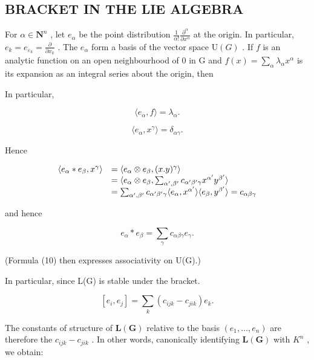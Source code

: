 \subsection{BRACKET IN THE LIE ALGEBRA}

For \(\alpha \in \mathbf{N}^n\) , let \(e_{\alpha}\) be the point distribution \(\frac{1}{\alpha!} \frac{\partial^{\alpha}}{\partial x^{\alpha}}\) at the origin. In particular, \(e_k = e_{\varepsilon_k} = \frac{\partial}{\partial x_k}\) . The \(e_{\alpha}\) form a basis of the vector space \(\mathrm{U}(G)\) . If \(f\) is an analytic function on an open neighbourhood of 0 in G and \(f(x) = \sum_{\alpha} \lambda_{\alpha} x^{\alpha}\) is its expansion as an integral series about the origin, then

In particular,

\[
\langle e _ {\alpha}, f \rangle = \lambda_ {\alpha}.
\]

\[
\langle e _ {\alpha}, x ^ {\gamma} \rangle = \delta_ {\alpha \gamma}.
\]

Hence

\[
\begin{array}{r l} \langle e _ {\alpha} * e _ {\beta}, x ^ {\gamma} \rangle & = \langle e _ {\alpha} \otimes e _ {\beta}, (x. y) ^ {\gamma} \rangle \\ & = \langle e _ {\alpha} \otimes e _ {\beta}, \sum_ {\alpha^ {\prime}, \beta^ {\prime}} c _ {\alpha^ {\prime} \beta^ {\prime} \gamma} x ^ {\alpha^ {\prime}} y ^ {\beta^ {\prime}} \rangle \\ & = \sum_ {\alpha^ {\prime}, \beta^ {\prime}} c _ {\alpha^ {\prime} \beta^ {\prime} \gamma} \langle e _ {\alpha}, x ^ {\alpha^ {\prime}} \rangle \langle e _ {\beta}, y ^ {\beta^ {\prime}} \rangle = c _ {\alpha \beta \gamma} \end{array}
\]

and hence

\[
e _ {\alpha} * e _ {\beta} = \sum_ {\gamma} c _ {\alpha \beta \gamma} e _ {\gamma}.\tag{11}
\]

(Formula (10) then expresses associativity on U(G).)

In particular, since L(G) is stable under the bracket.

\[
[ e _ {i}, e _ {j} ] = \sum_ {k} (c _ {i j k} - c _ {j i k}) e _ {k}.\tag{12}
\]

The constants of structure of \(\mathbf{L}(\mathbf{G})\) relative to the basis \((e_{1},\ldots,e_{n})\) are therefore the \(c_{ijk}-c_{jik}\) . In other words, canonically identifying \(\mathbf{L}(\mathbf{G})\) with \(K^{n}\) , we obtain:

